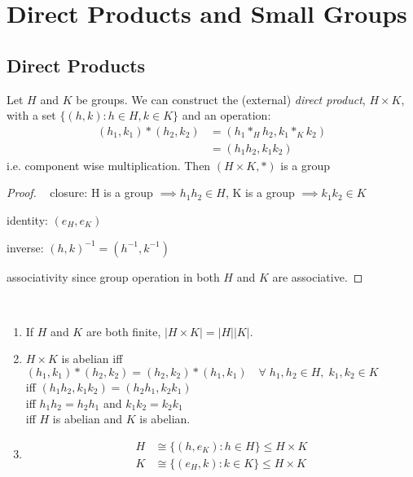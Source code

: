 \section{Direct Products and Small Groups}

\subsection{Direct Products}

\begin{definition}
  Let $H$ and $K$ be groups. We can construct the (external) \emph{direct product}, $H \times K$, with a set $\{ (h, k): h \in H, k \in K \}$ and an operation:
  \begin{align*}
    (h_1, k_1) * (h_2, k_2) &= (h_1 *_H h_2, k_1 *_K k_2) \\
    &= (h_1 h_2, k_1 k_2)
  \end{align*} i.e. component wise multiplication. 
  Then $(H \times K, *)$ is a group
\end{definition}

\begin{proof} ~
closure: H is a group $\implies h_1 h_2 \in H$, K is a group $\implies k_1 k_2 \in K$

identity: $(e_H, e_K)$

inverse: $(h, k)^{-1} = (h^{-1}, k^{-1})$

associativity since group operation in both $H$ and $K$ are associative.
\end{proof} 

\begin{remark} ~
  \begin{enumerate}
    \item If $H$ and $K$ are both finite, $| H \times K| = |H| |K|$.
    \item $H \times K$ is abelian iff $(h_1, k_1) * (h_2, k_2) = (h_2, k_2) * (h_1, k_1) \quad \forall \; h_1, h_2 \in H,\; k_1, k_2 \in K$ \\
    iff $(h_1 h_2, k_1 k_2) = (h_2 h_1, k_2 k_1)$ \\
    iff $h_1 h_2 = h_2 h_1$ and $k_1 k_2 = k_2 k_1$ \\
    iff $H$ is abelian and $K$ is abelian.
    \item \begin{align*}
      H &\cong \{ (h, e_K) : h \in H \} \leq H \times K \\
      K &\cong \{ (e_H, k) : k \in K \} \leq H \times K
    \end{align*}
  \end{enumerate}
\end{remark} 

